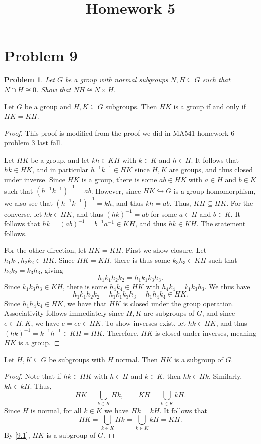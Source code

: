 \documentclass[11pt, letterpaper]{article}
\title{Homework 5}
\theoremstyle{plain}
\newtheorem{problem}{Problem}[section]
\begin{document}
\makeproblem
\setcounter{section}{8}

\section{Problem 9}

\begin{problem}\label{9}
	Let $G$ be a group with normal subgroups $N,H\subseteq G$ such that $N \cap H\cong 0$. Show that $NH \cong N\times H$.
\end{problem}
\begin{lemma}\label{9.1}
	Let $G$ be a group and $H,K\subseteq G$ subgroups. Then $HK$ is a group if and only if $HK=KH$.
\end{lemma}
\begin{proof}
	This proof is modified from the proof we did in MA541 homework 6 problem 3 last fall.

	Let $HK$ be a group, and let $kh\in KH$ with $k\in K$ and $h\in H$. It follows that $hk\in HK$, and in particular $h^{-1} k^{-1} \in HK$ since $H,K$ are groups, and thus closed under inverse. Since $HK$ is a group, there is some $ab\in HK$ with $a\in H$ and $b\in K$ such that $\left( h^{-1} k^{-1}  \right) ^{-1} =ab$. However, since $HK\hookrightarrow G$ is a group homomorphism, we also see that $\left( h^{-1} k^{-1}  \right) ^{-1} =kh$, and thus $kh=ab$. Thus, $KH \subseteq HK$. For the converse, let $hk\in HK$, and thus $(hk)^{-1} =ab$ for some $a\in H$ and $b\in K$. It follows that $hk=(ab)^{-1} =b^{-1} a^{-1} \in KH$, and thus $hk\in KH$. The statement follows.

	For the other direction, let $HK=KH$. First we show closure. Let $h_1k_1,h_2k_2\in HK$. Since $HK=KH$, there is thus some $k_3h_3\in KH$ such that $h_2k_2=k_3h_3$, giving
	\[
		h_1k_1h_2k_2=h_1k_1k_3h_3
	.\]
	Since $k_1k_3h_3\in KH$, there is some $h_4k_4\in HK$ with $h_4k_4=k_1k_3h_3$. We thus have
	\[
		h_1k_1h_2k_2=h_1k_1k_3h_3=h_1h_4k_4\in HK
	.\]
	Since $h_1h_4k_4\in HK$, we have that $HK$ is closed under the group operation. Associativity follows immediately since $H,K$ are subgroups of $G$, and since $e\in H,K$, we have $e=ee\in HK$. To show inverses exist, let $hk\in HK$, and thus $(hk)^{-1} =k^{-1} h^{-1} \in KH=HK$. Therefore, $HK$ is closed under inverses, meaning $HK$ is a group.
\end{proof}

\begin{corollary}\label{cor}
	Let $H,K\subseteq G$ be subgroups with $H$ normal. Then $HK$ is a subgroup of $G$.
\end{corollary}
\begin{proof}
	Note that if $hk\in HK$ with $h\in H$ and $k\in K$, then $hk\in Hk$. Similarly, $kh\in kH$. Thus,
	\[
		HK=\bigcup_{k\in K} Hk,\qquad KH=\bigcup_{k\in K} kH
	.\]
	Since $H$ is normal, for all $k\in K$ we have $Hk=kH$. It follows that
	\[
		HK=\bigcup_{k\in K} Hk=\bigcup_{k\in K} kH=KH
	.\]
	By \cref{9.1}, $HK$ is a subgroup of $G$.
\end{proof}
\end{document}
